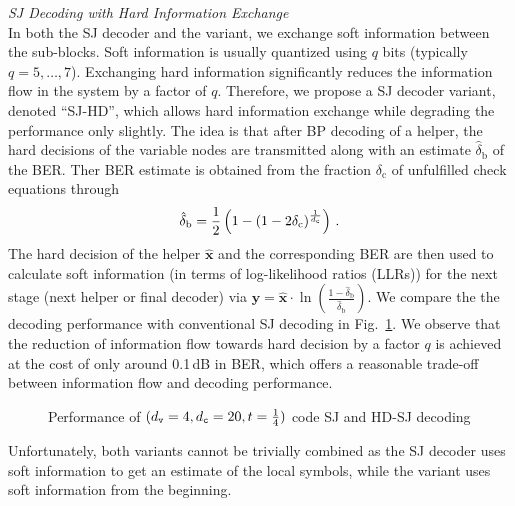 \vspace*{0.8ex}
\noindent\emph{SJ Decoding with Hard Information Exchange} \\
In both the SJ decoder and the variant, we exchange soft information between the sub-blocks. Soft information is usually quantized using $q$ bits (typically $q = 5,\ldots, 7$). Exchanging hard information significantly reduces the information flow in the system by a factor of $q$. Therefore, we propose a SJ decoder variant, denoted ``SJ-HD'', which allows hard information exchange while degrading the performance only slightly. The idea is that after BP decoding of a helper, the hard decisions of the variable nodes are transmitted along with an estimate $\hat{\delta}_{\mathrm{b}}$ of the BER. Ther BER estimate is obtained from the fraction $\delta_{\mathrm{c}}$  of unfulfilled check equations through
\begin{equation}
    \hat{\delta}_{\mathrm{b}} = \frac12\left(1-\left(1-2\delta_{\mathrm{c}}\right)^{\frac 1{d_\mathtt{c}}}\right)\,.
    \label{equ_BER_estimate}
\end{equation}
The hard decision of the helper $\hat{\boldsymbol{x}}$ and the corresponding BER are then used to calculate soft information (in terms of log-likelihood ratios (LLRs)) for the next stage (next helper or final decoder) via $\boldsymbol{y}=\hat{\boldsymbol{x}}\cdot\ln\left(\frac{1-\hat{\delta}_{\mathrm{b}}}{\hat{\delta}_{\mathrm{b}}}\right)$. 
We compare the the decoding performance with conventional SJ decoding in Fig.~\ref{figure_comparison_sg_var2}. We observe that the reduction of information flow towards hard decision by a factor $q$ is achieved at the cost of only around 0.1\,dB in BER, which offers a reasonable trade-off between information flow and decoding performance.

\begin{figure}[t]
     
    \caption{Performance of $(d_\mathtt{v}=4, d_\mathtt{c}=20, t=\frac14)$ code SJ and HD-SJ decoding}
    \label{figure_comparison_sg_var2}
\end{figure}

Unfortunately, both variants cannot be trivially combined as the SJ decoder uses soft information to get an estimate of the local symbols, while the variant uses soft information from the beginning.